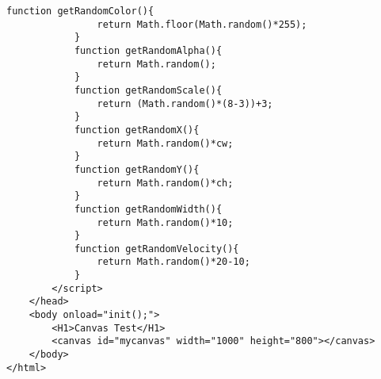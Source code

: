 \documentclass[mingoth,11pt,a4j,uplatex]{jsarticle}
\begin{document}
\begin{lstlisting}[caption=三角形の追加]
			function getRandomColor(){
				return Math.floor(Math.random()*255);
			}
			function getRandomAlpha(){
				return Math.random();
			}
			function getRandomScale(){
				return (Math.random()*(8-3))+3;
			}
			function getRandomX(){
				return Math.random()*cw;
			}
			function getRandomY(){
				return Math.random()*ch;
			}
			function getRandomWidth(){
				return Math.random()*10;
			}
			function getRandomVelocity(){
				return Math.random()*20-10;
			}
		</script>
	</head>
	<body onload="init();">
		<H1>Canvas Test</H1>
		<canvas id="mycanvas" width="1000" height="800"></canvas>
	</body>
</html>
\end{lstlisting}



\end{document}
